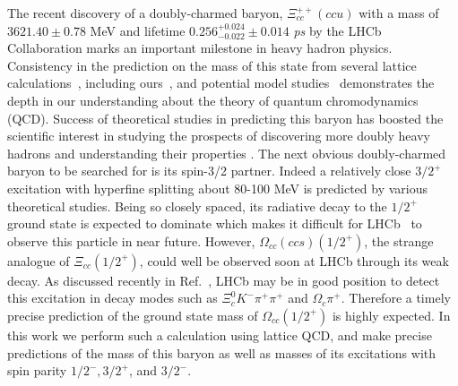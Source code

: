 \documentclass[showkeys,aps,twocolumn,showpacs,preprintnumbers,amsmath,amssymb,prl,letterpaper,floatfix,nofootinbib,superscriptaddress,]{revtex4-1}
\begin{document}
The recent discovery of a doubly-charmed baryon, $\Xi^{++}_{cc} (ccu)$ with a mass of $3621.40\pm0.78$ MeV and lifetime $0.256^{+0.024}_{-0.022} \pm 0.014$ {\it{ps}}
by the LHCb Collaboration \cite{Aaij:2017ueg,Aaij:2018wzf} marks an important milestone in heavy hadron physics. Consistency in the prediction on the
mass of this state from several lattice calculations~\cite{Lewis:2001iz,Mathur:2002ce,Liu:2009jc,Briceno:2012wt,Basak:2012py,Basak:2013oya,Namekawa:2013vu,Brown:2014ena,Bali:2015lka,Padmanath:2015jea,Chen:2017kxr,Alexandrou:2017xwd,Mondal:2017nhw}, including ours~\cite{Basak:2012py,Basak:2013oya,Padmanath:2015jea,Mondal:2017nhw}, and potential model studies~\cite{Karliner:2014gca} demonstrates 
the depth in our understanding about the theory of quantum chromodynamics (QCD).  Success of theoretical studies in predicting this baryon has boosted the scientific interest in studying the prospects of discovering more doubly 
 heavy hadrons and understanding their properties \cite{Karliner:2018hos,Karliner:2017elp,Karliner:2017qjm,Eichten:2017ffp,Mathur:2018epb,Junnarkar:2017sey,Aaij:2018zrb}. The next obvious doubly-charmed baryon to be searched for is its spin-3/2 partner. Indeed a relatively close $3/2^{+}$ excitation with hyperfine splitting about 80-100 MeV is predicted by various theoretical studies.
Being so closely spaced, its radiative decay to the $1/2^+$ ground state is expected to dominate which makes it difficult for LHCb~\cite{Aaij:2014jba} to observe this particle in near future. However, $\Omega_{cc}(ccs)(1/2^+)$, the strange analogue of $\Xi_{cc}(1/2^{+})$, could well be observed soon at LHCb through its weak decay.
As discussed recently in Ref.~\cite{Karliner:2018hos}, LHCb may be in good position to detect this excitation in decay modes such as $\Xi_c^{0}K^{-}\pi^{+}\pi^{+}$ and $\Omega_{c}\pi^{+}$.
Therefore a timely precise prediction of the ground state mass of $\Omega_{cc}(1/2^+)$ is highly expected.
In this work we perform such a calculation using lattice QCD,
 and make precise predictions of the mass of this baryon as well as masses of its excitations with spin parity $1/2^{-}, 3/2^{+}$, and $3/2^{-}$.
\end{document}
